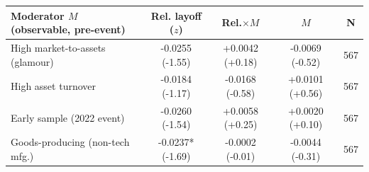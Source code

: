 \begin{tabular}{lcccc}
\toprule
Moderator $M$ (observable, pre-event) & Rel. layoff ($z$) & Rel.$\times M$ & $M$ & N \\
\midrule
High market-to-assets (glamour) & -0.0255 (-1.55) & +0.0042 (+0.18) & -0.0069 (-0.52) & 567 \\
High asset turnover & -0.0184 (-1.17) & -0.0168 (-0.58) & +0.0101 (+0.56) & 567 \\
Early sample (2022 event) & -0.0260 (-1.54) & +0.0058 (+0.25) & +0.0020 (+0.10) & 567 \\
Goods-producing (non-tech mfg.) & -0.0237* (-1.69) & -0.0002 (-0.01) & -0.0044 (-0.31) & 567 \\
\bottomrule
\end{tabular}